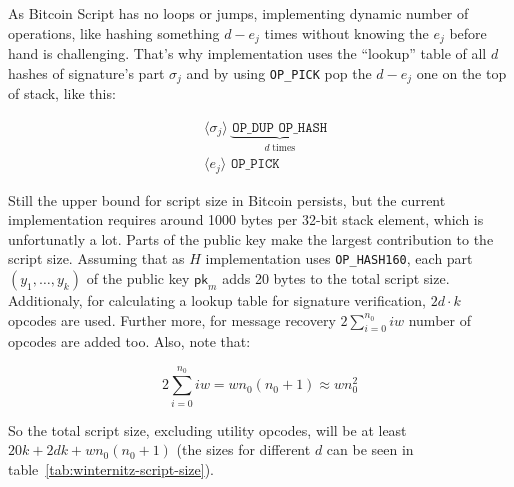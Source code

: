 \documentclass{iacrtrans}
\newcommand{\elem}[1]{\, \langle #1 \rangle \,}
\newcommand{\opcode}[1]{\, \texttt{#1} \,}
\begin{document}
As Bitcoin Script has no loops or jumps, implementing dynamic number
of operations, like hashing something $d - e_j$ times without knowing
the $e_j$ before hand is challenging. That's why implementation uses
the ``lookup'' table of all $d$ hashes of signature's part $\sigma_j$ and
by using \texttt{OP\_PICK} pop the $d - e_j$ one on the top of stack,
like this:

\begin{empheqboxed}
  \begin{align*}
    & \elem{\sigma_j} \underbrace{\opcode{OP\_DUP}
    \opcode{OP\_HASH}}_{d \; \text{times}} \\
    & \elem{e_j} \opcode{OP\_PICK}
  \end{align*}
\end{empheqboxed}

Still the upper bound for script size in Bitcoin persists, but the
current implementation requires around 1000 bytes per 32-bit stack
element, which is unfortunatly a lot. Parts of the public key make the
largest contribution to the script size. Assuming that as $H$
implementation uses \texttt{OP\_HASH160}, each part $(y_1,\dots,y_k)$
of the public key $\mathsf{pk}_{m}$ adds 20 bytes to the total script
size. Additionaly, for calculating a lookup table for signature
verification, $2d \cdot k$ opcodes are used. Further more, for message
recovery $2 \sum_{i = 0}^{n_0} i w$ number of opcodes are added
too. Also, note that:

\begin{equation}
  \label{eq:opcodes-for-recovery-number}
    2 \sum_{i = 0}^{n_0} i w = w n_0 (n_0+1) \approx w n_0^2
\end{equation}

So the total script size, excluding utility opcodes, will be at least
$20k + 2 d k + w n_0 (n_0+1)$ (the sizes for different $d$ can be seen
in table~\ref{tab:winternitz-script-size}).
\end{document}
